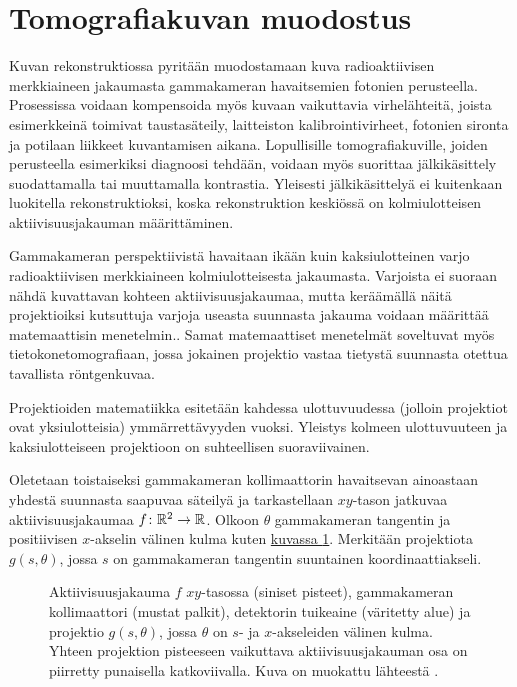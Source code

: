 \section{Tomografiakuvan muodostus}
Kuvan rekonstruktiossa pyritään muodostamaan kuva radioaktiivisen merkkiaineen jakaumasta gammakameran havaitsemien fotonien perusteella\cite{cherry_single_2012, bruyant_analytic_2002, beister_iterative_2012, van_audenhaege_review_2015, bercovich_medical_2018}. Prosessissa voidaan kompensoida myös kuvaan vaikuttavia virhelähteitä, joista esimerkkeinä toimivat taustasäteily, laitteiston kalibrointivirheet, fotonien sironta ja potilaan liikkeet kuvantamisen aikana\cite{beister_iterative_2012, bruyant_analytic_2002}. Lopullisille tomografiakuville, joiden perusteella esimerkiksi diagnoosi tehdään, voidaan myös suorittaa jälkikäsittely suodattamalla tai muuttamalla kontrastia. Yleisesti jälkikäsittelyä ei kuitenkaan luokitella rekonstruktioksi, koska rekonstruktion keskiössä on kolmiulotteisen aktiivisuusjakauman määrittäminen.\cite{bruyant_analytic_2002}

Gammakameran perspektiivistä havaitaan ikään kuin kaksiulotteinen varjo radioaktiivisen merkkiaineen kolmiulotteisesta jakaumasta. Varjoista ei suoraan nähdä kuvattavan kohteen aktiivisuusjakaumaa, mutta keräämällä näitä projektioiksi kutsuttuja varjoja useasta suunnasta jakauma voidaan määrittää matemaattisin menetelmin.\cite{cherry_single_2012, bruyant_analytic_2002, beister_iterative_2012, van_audenhaege_review_2015, bercovich_medical_2018}. Samat matemaattiset menetelmät soveltuvat myös tietokonetomografiaan, jossa jokainen projektio vastaa tietystä suunnasta otettua tavallista röntgenkuvaa.

Projektioiden matematiikka esitetään kahdessa ulottuvuudessa (jolloin projektiot ovat yksiulotteisia) ymmärrettävyyden vuoksi. Yleistys kolmeen ulottuvuuteen ja kaksiulotteiseen projektioon on suhteellisen suoraviivainen.

Oletetaan toistaiseksi gammakameran kollimaattorin havaitsevan ainoastaan yhdestä suunnasta saapuvaa säteilyä ja tarkastellaan $xy$-tason jatkuvaa aktiivisuusjakaumaa $f\colon\mathbb{R}^{2}\to\mathbb{R}$. Olkoon $\theta$ gammakameran tangentin ja positiivisen $x$-akselin välinen kulma kuten \hyperref[fig:projektio]{kuvassa \ref*{fig:projektio}}. Merkitään projektiota $g(s, \theta)$, jossa $s$ on gammakameran tangentin suuntainen koordinaattiakseli.

\begin{figure}[H]
    \centering
    \captionsetup{width=.9\textwidth}
    
    \caption{Aktiivisuusjakauma $f$ $xy$-tasossa (siniset pisteet), gammakameran kollimaattori (mustat palkit), detektorin tuikeaine (väritetty alue) ja projektio $g(s, \theta)$, jossa $\theta$ on $s$- ja $x$-akseleiden välinen kulma. Yhteen projektion pisteeseen vaikuttava aktiivisuusjakauman osa on piirretty punaisella katkoviivalla. Kuva on muokattu lähteestä \cite{bruyant_analytic_2002}.}
    \label{fig:projektio}
\end{figure}

